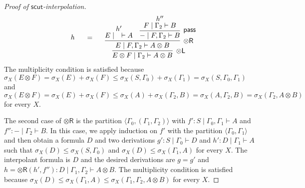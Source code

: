 \documentclass[sn-mathphys-num]{sn-jnl}%
\newcommand{\GG}{\Gamma}
\newcommand{\vd}{\vdash}
\newcommand{\tl}{\otimes \mathsf{L}}
\newcommand{\tr}{\otimes\mathsf{R}}
\newcommand{\pass}{\mathsf{pass}}
\newcommand{\ot}{\otimes}
\newcommand{\mf}[1]{\mathsf{#1}}
\newcommand{\gs}[1]{\sigma_{X} (#1)}
\theoremstyle{thmstyleone}%
\theoremstyle{thmstyletwo}%
\theoremstyle{thmstylethree}%
\begin{document}
\begin{proof}[Proof of $\mf{scut}$-interpolation]
\begin{displaymath}
\begin{array}{c}
    \quad
    \begin{array}{c}
      h
    \end{array}
    \quad
    =
    \quad
    \begin{array}{c}
      \infer[\tl]{E \ot F \mid \GG_2 \vd A \ot B}{
      \infer[\tr]{E \mid F , \GG_2 \vd A \ot B}{
        \deduce{E \mid \quad \vd A}{h'}
        &
        \infer[\pass]{{-} \mid F , \GG_2 \vd B}{
          \deduce{F \mid \GG_2 \vd B}{h''}
        }
      }
    }
    \end{array}
  \end{array}
\end{displaymath}
The multiplicity condition is satisfied because $\gs{E \ot F} = \gs{E} + \gs{F} \leq \gs{S , \GG_0} + \gs{\GG_1} = \gs{S, \GG_0 , \GG_1}$ and $\gs{E \ot F} = \gs{E} + \gs{F} \leq \gs{A} + \gs{\GG_2 , B} = \gs{A, \GG_2 , B} = \gs{\GG_2, A \ot B}$ for every $X$.

The second case of $\tr$ is the partition $\langle \GG_0, (\GG_1 , \GG_2) \rangle$ with $f' : S \mid \GG_0 , \GG_1 \vd A$ and $f'' : {-} \mid \GG_2 \vd B$.
In this case, we apply induction on $f'$ with the partition $\langle \GG_0 , \GG_1 \rangle$ and then obtain a formula $D$ and two derivations $g' : S \mid \GG_0 \vd D$ and $h' : D \mid \GG_1 \vd A$ such that $\gs{D} \leq \gs{S, \GG_0} $ and $ \gs{D} \leq \gs{\GG_1 , A}$ for every $X$.
The interpolant formula is $D$ and the desired derivations are $g = g'$ and $h = \tr (h' , f'') : D \mid \GG_1 , \GG_2 \vd A \ot B$.
The multiplicity condition is satisfied because $\gs{D} \leq \gs{\GG_1 , A} \leq \gs{\GG_1 , \GG_2 , A \ot B}$ for every $X$.


\end{proof}
\end{document}
